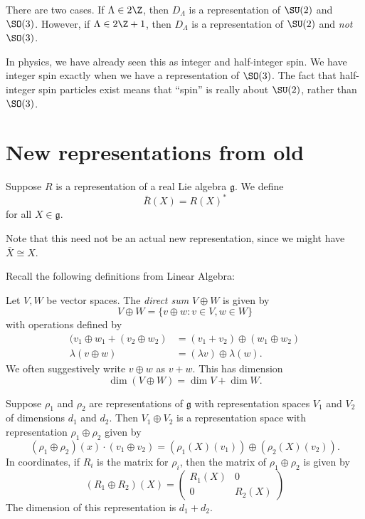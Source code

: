\documentclass[a4paper]{article}
\begin{document}
There are two cases. If $\Lambda \in 2\Z$, then $D_\Lambda$ is a representation of $\SU(2)$ and $\SO(3)$. However, if $\Lambda \in 2\Z + 1$, then $D_\Lambda$ is a representation of $\SU(2)$ and \emph{not} $\SO(3)$.

In physics, we have already seen this as integer and half-integer spin. We have integer spin exactly when we have a representation of $\SO(3)$. The fact that half-integer spin particles exist means that ``spin'' is really about $\SU(2)$, rather than $\SO(3)$.

\section{New representations from old}
\begin{defi}
  Suppose $R$ is a representation of a real Lie algebra $\mathfrak{g}$. We define
  \[
    \bar{R}(X) = R(X)^*
  \]
  for all $X \in \mathfrak{g}$.
\end{defi}
Note that this need not be an actual new representation, since we might have $\bar{X} \cong X$.

Recall the following definitions from Linear Algebra:
\begin{defi}
  Let $V, W$ be vector spaces. The \emph{direct sum} $V \oplus W$ is given by
  \[
    V \oplus W = \{v \oplus w: v \in V, w \in W\}
  \]
  with operations defined by
  \begin{align*}
    (v_1 \oplus w_1 + (v_2 \oplus w_2) &= (v_1 + v_2) \oplus (w_1 \oplus w_2)\\
    \lambda(v \oplus w) &= (\lambda v) \oplus \lambda(w).
  \end{align*}
  We often suggestively write $v \oplus w$ as $v + w$. This has dimension
  \[
    \dim(V \oplus W) = \dim V + \dim W.
  \]
\end{defi}

\begin{defi}
  Suppose $\rho_1$ and $\rho_2$ are representations of $\mathfrak{g}$ with representation spaces $V_1$ and $V_2$ of dimensions $d_1$ and $d_2$. Then $V_1 \oplus V_2$ is a representation space with representation $\rho_1 \oplus \rho_2$ given by
  \[
    (\rho_1 \oplus \rho_2)(x) \cdot (v_1 \oplus v_2) = (\rho_1(X)(v_1)) \oplus (\rho_2(X)(v_2)).
  \]
  In coordinates, if $R_i$ is the matrix for $\rho_i$, then the matrix of $\rho_1 \oplus \rho_2$ is given by
  \[
    (R_1 \oplus R_2)(X) =
    \begin{pmatrix}
      R_1(X) & 0\\
      0 & R_2(X)
    \end{pmatrix}
  \]
  The dimension of this representation is $d_1 + d_2$.
\end{defi}
\end{document}
